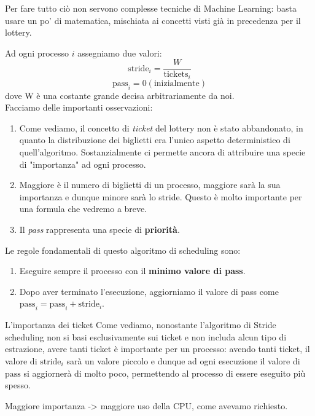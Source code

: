 \documentclass[12pt]{report}
\begin{document}
	Per fare tutto ciò non servono complesse tecniche di Machine Learning: basta usare un po' di matematica, mischiata ai concetti visti già in precedenza per il lottery.
	
	\newpage
	Ad ogni processo $i$ assegniamo due valori:
	\[
		\text{stride}_i = \frac{W}{\text{tickets}_i}
	\]
	\[
		\text{pass}_i = 0 (\text{inizialmente})
	\]
	dove W è una costante grande decisa arbitrariamente da noi.\\
	
	Facciamo delle importanti osservazioni:
	\begin{enumerate}
		\item Come vediamo, il concetto di \textit{ticket} del lottery non è stato abbandonato, in quanto la distribuzione dei biglietti era l'unico aspetto deterministico di quell'algoritmo. Sostanzialmente ci permette ancora di attribuire una specie di "importanza" ad ogni processo.
		
		\item Maggiore è il numero di biglietti di un processo, maggiore sarà la sua importanza e dunque minore sarà lo stride. Questo è molto importante per una formula che vedremo a breve.
		
		\item Il \textit{pass} rappresenta una specie di \textbf{priorità}.
	\end{enumerate}
	
	Le regole fondamentali di questo algoritmo di scheduling sono:
	\begin{enumerate}
		\item Eseguire sempre il processo con il \textbf{minimo valore di pass}.
		
		\item Dopo aver terminato l'esecuzione, aggiorniamo il valore di pass come $\text{pass}_i = \text{pass}_i + \text{stride}_i$.
	\end{enumerate}
	
	\begin{osservazione}{L'importanza dei ticket}{}
		Come vediamo, nonostante l'algoritmo di Stride scheduling non si basi esclusivamente sui ticket e non includa alcun tipo di estrazione, avere tanti ticket è importante per un processo: avendo tanti ticket, il valore di $\text{stride}_i$ sarà un valore piccolo e dunque ad ogni esecuzione il valore di $\text{pass}$ si aggiornerà di molto poco, permettendo al processo di essere eseguito più spesso.
		\smallbreak
		
		Maggiore importanza -> maggiore uso della CPU, come avevamo richiesto.
	\end{osservazione}
	
\end{document}

